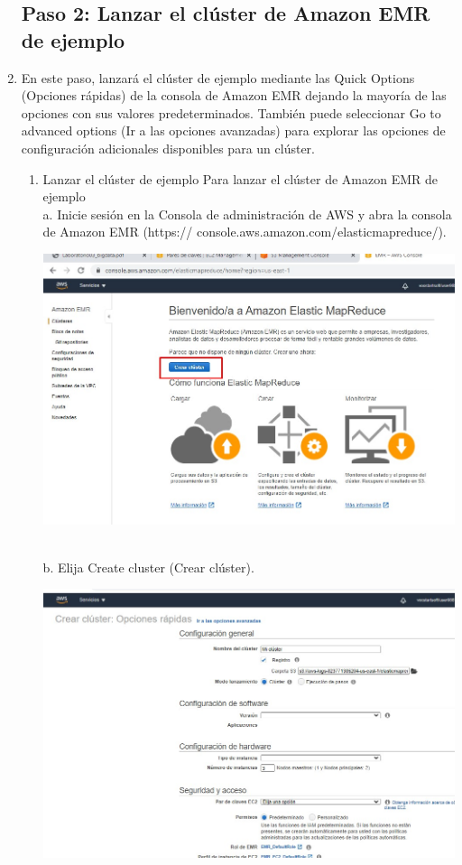 \documentclass[12pt,letterpaper]{article}
\begin{document}
\begin{enumerate}
	
	
\subsection{Paso 2: Lanzar el clúster de Amazon EMR de ejemplo }
\item  En este paso, lanzará el clúster de ejemplo mediante las Quick Options (Opciones rápidas) de la consola de
Amazon EMR dejando la mayoría de las opciones con sus valores predeterminados.
También puede seleccionar Go to advanced options (Ir a las opciones avanzadas) para explorar las opciones
de configuración adicionales disponibles para un clúster.
	\begin{enumerate}
		
		\item Lanzar el clúster de ejemplo
		Para lanzar el clúster de Amazon EMR de ejemplo
	\\	a. Inicie sesión en la Consola de administración de AWS y abra la consola de Amazon EMR (https://
		console.aws.amazon.com/elasticmapreduce/).
		\begin{center}
			\includegraphics[width=14cm]{./img/2.1.jpg} 
		\end{center}
     \\	b. Elija Create cluster (Crear clúster).
     \begin{center}
     	\includegraphics[width=14cm]{./img/2.2.jpg} 

\end{center}
\end{enumerate}
\end{enumerate}
\end{document}
